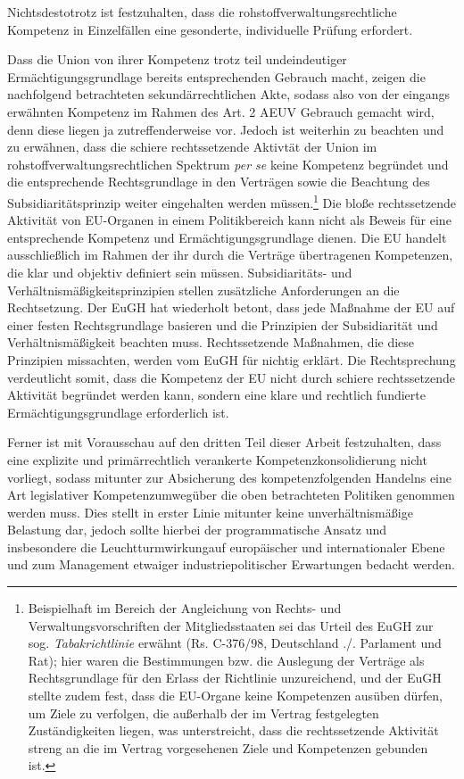 \documentclass[12pt,a4paper,oneside]{book} %
\begin{document}
{	Nichtsdestotrotz ist festzuhalten, dass die rohstoffverwaltungsrechtliche Kompetenz in Einzelfällen eine gesonderte, individuelle Prüfung erfordert.
	
	Dass die Union von ihrer Kompetenz trotz teil undeindeutiger Ermächtigungsgrundlage bereits entsprechenden Gebrauch macht, zeigen die nachfolgend betrachteten sekundärrechtlichen Akte, sodass also von der eingangs erwähnten Kompetenz im Rahmen des Art. 2 AEUV Gebrauch gemacht wird, denn diese liegen ja zutreffenderweise vor. Jedoch ist weiterhin zu beachten und zu erwähnen, dass die schiere rechtssetzende Aktivtät der Union im rohstoffverwaltungsrechtlichen Spektrum \textit{per se} keine Kompetenz begründet und die entsprechende Rechtsgrundlage in den Verträgen sowie die Beachtung des Subsidiaritätsprinzip weiter eingehalten werden müssen.\footnote{Beispielhaft im Bereich der Angleichung von Rechts- und Verwaltungsvorschriften der Mitgliedsstaaten sei das Urteil des EuGH zur sog. \textit{Tabakrichtlinie} erwähnt (Rs. C-376/98, Deutschland ./. Parlament und Rat); hier waren die Bestimmungen bzw. die Auslegung der Verträge als Rechtsgrundlage für den Erlass der Richtlinie unzureichend, und der EuGH stellte zudem fest, dass die EU-Organe keine Kompetenzen ausüben dürfen, um Ziele zu verfolgen, die außerhalb der im Vertrag festgelegten Zuständigkeiten liegen, was unterstreicht, dass die rechtssetzende Aktivität streng an die im Vertrag vorgesehenen Ziele und Kompetenzen gebunden ist.} Die bloße rechtssetzende Aktivität von EU-Organen in einem Politikbereich kann nicht als Beweis für eine entsprechende Kompetenz und Ermächtigungsgrundlage dienen. Die EU handelt ausschließlich im Rahmen der ihr durch die Verträge übertragenen Kompetenzen, die klar und objektiv definiert sein müssen. Subsidiaritäts- und Verhältnismäßigkeitsprinzipien stellen zusätzliche Anforderungen an die Rechtsetzung. Der EuGH hat wiederholt betont, dass jede Maßnahme der EU auf einer festen Rechtsgrundlage basieren und die Prinzipien der Subsidiarität und Verhältnismäßigkeit beachten muss. Rechtssetzende Maßnahmen, die diese Prinzipien missachten, werden vom EuGH für nichtig erklärt. Die Rechtsprechung verdeutlicht somit, dass die Kompetenz der EU nicht durch schiere rechtssetzende Aktivität begründet werden kann, sondern eine klare und rechtlich fundierte Ermächtigungsgrundlage erforderlich ist.
	
	Ferner ist mit Vorausschau auf den dritten Teil dieser Arbeit festzuhalten, dass eine explizite und primärrechtlich verankerte Kompetenzkonsolidierung nicht vorliegt, sodass mitunter zur Absicherung des kompetenzfolgenden Handelns eine Art legislativer \glqq Kompetenzumweg\grqq über die oben betrachteten Politiken genommen werden muss. Dies stellt in erster Linie mitunter keine unverhältnismäßige Belastung dar, jedoch sollte hierbei der programmatische Ansatz und insbesondere die \glqq Leuchtturmwirkung\grqq auf europäischer und internationaler Ebene und zum Management etwaiger industriepolitischer Erwartungen bedacht werden.
	
}
\end{document}
